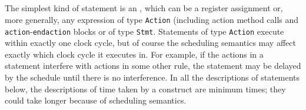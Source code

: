 
 \\
 \\
 \\
  \\
 \\
 \\
 \\

 \\



 \\

 \\

 \\


 \\

 \\
    \\

The simplest kind of statement is an , which can be a
register assignment or, more generally, any
expression of type \texttt{Action} (including action method calls
 and \texttt{action}-{\tt endaction} blocks 
 or of type \texttt{Stmt}.   Statements of type
\texttt{Action} execute within exactly one clock cycle, but of course the
scheduling semantics may
affect exactly which clock cycle it executes in.  For example, if the actions
in a statement interfere with actions in some other rule, the statement may be
delayed by the schedule until there is no interference.  In all the
descriptions of statements below, the descriptions of time taken by a
construct are minimum times; they could take longer because of scheduling
semantics.

